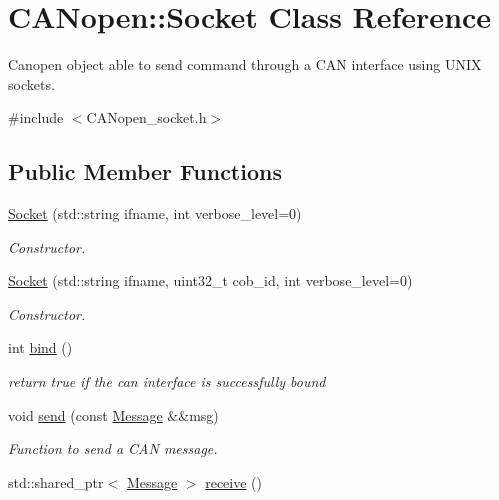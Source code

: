 \hypertarget{class_c_a_nopen_1_1_socket}{}\section{C\+A\+Nopen\+:\+:Socket Class Reference}
\label{class_c_a_nopen_1_1_socket}


Canopen object able to send command through a C\+AN interface using U\+N\+IX sockets.  




{\ttfamily \#include $<$C\+A\+Nopen\+\_\+socket.\+h$>$}

\subsection*{Public Member Functions}
\begin{DoxyCompactItemize}
\item 
\hyperlink{class_c_a_nopen_1_1_socket_a66c37f6819a5ad8829326380812446e6}{Socket} (std\+::string ifname, int verbose\+\_\+level=0)
\begin{DoxyCompactList}\small\item\em Constructor. \end{DoxyCompactList}\item 
\hyperlink{class_c_a_nopen_1_1_socket_af234eea5568f8f436cb815ab70e75f2f}{Socket} (std\+::string ifname, uint32\+\_\+t cob\+\_\+id, int verbose\+\_\+level=0)
\begin{DoxyCompactList}\small\item\em Constructor. \end{DoxyCompactList}\item 
int \hyperlink{class_c_a_nopen_1_1_socket_a6f63808addc451747608c21b958821f4}{bind} ()
\begin{DoxyCompactList}\small\item\em return true if the can interface is successfully bound \end{DoxyCompactList}\item 
void \hyperlink{class_c_a_nopen_1_1_socket_aa147801723e58f287d06b6df28837c44}{send} (const \hyperlink{class_c_a_nopen_1_1_message}{Message} \&\&msg)
\begin{DoxyCompactList}\small\item\em Function to send a C\+AN message. \end{DoxyCompactList}\item 
std\+::shared\+\_\+ptr$<$ \hyperlink{class_c_a_nopen_1_1_message}{Message} $>$ \hyperlink{class_c_a_nopen_1_1_socket_a15363c054b276777b4290c91fd05edd5}{receive} ()
\end{DoxyCompactItemize}


